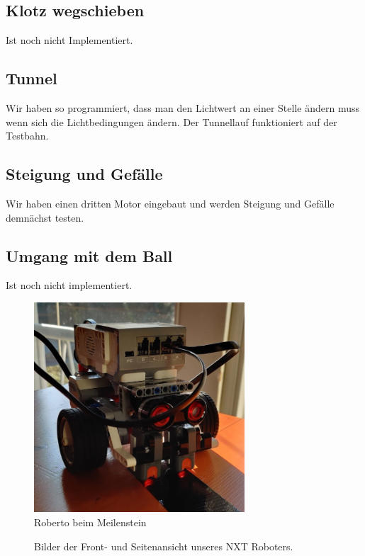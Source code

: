 \documentclass[11pt]{article}
\begin{document}
\subsection{Klotz wegschieben}
Ist noch nicht Implementiert.

\subsection{Tunnel}
Wir haben so programmiert, dass man den Lichtwert an einer Stelle ändern muss wenn sich die Lichtbedingungen ändern. Der Tunnellauf funktioniert auf der Testbahn.

\subsection{Steigung und Gefälle}
Wir haben einen dritten Motor eingebaut und werden Steigung und Gefälle demnächst testen.

\subsection{Umgang mit dem Ball}
Ist noch nicht implementiert.

\begin{figure}[H]
  \centering
  \includegraphics[width=0.7\textwidth]{roberto_alt.jpeg}
  \caption{Roberto beim Meilenstein}
  \label{Figure:roberto_alt}
\end{figure}

\begin{figure}[H]
  \centering
  \caption{Bilder der Front- und Seitenansicht unseres NXT Roboters.}
  \label{Figure:RobotPics}  %
\end{figure}
\end{document}
